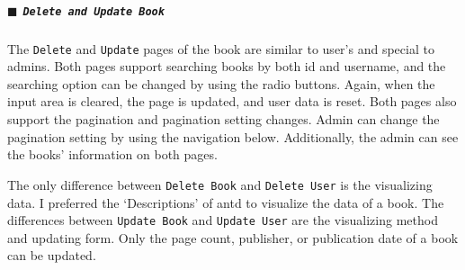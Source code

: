 \subparagraph{$\blacksquare$ \texttt{Delete and Update Book}}

The \texttt{Delete} and \texttt{Update} pages of the book are similar to user's and special to admins. Both pages support searching books by both id and username, and the searching option can be changed by using the radio buttons. Again, when the input area is cleared, the page is updated, and user data is reset. Both pages also support the pagination and pagination setting changes. Admin can change the pagination setting by using the navigation below. Additionally, the admin can see the books' information on both pages.

The only difference between \texttt{Delete Book} and \texttt{Delete User} is the visualizing data. I preferred the `Descriptions' of antd to visualize the data of a book. The differences between \texttt{Update Book} and \texttt{Update User} are the visualizing method and updating form. Only the page count, publisher, or publication date of a book can be updated.

